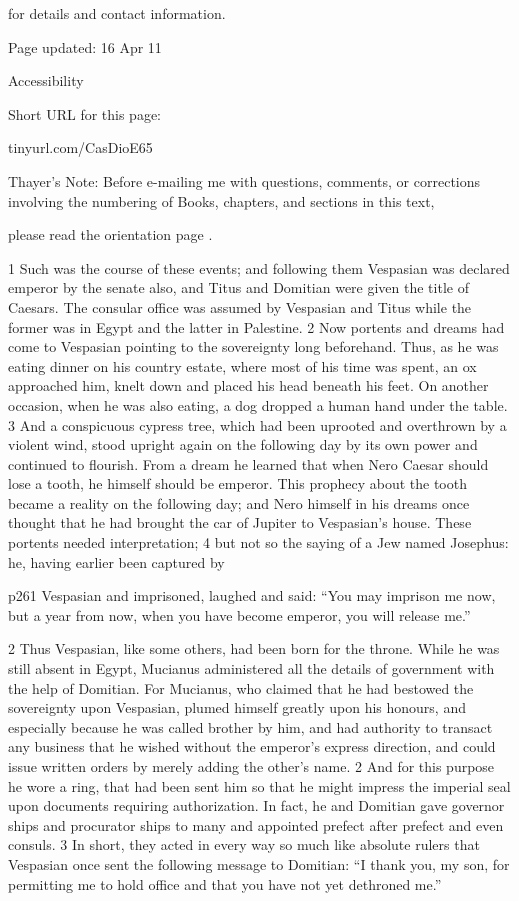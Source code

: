 for details and contact information.

Page updated:
16 Apr 11

Accessibility


Short URL for this page:

tinyurl.com/CasDioE65

Thayer's Note: Before e-mailing me with questions, comments, or corrections involving the numbering of Books, chapters, and sections in this text,

please read the orientation page .


1
Such was the course of these events; and following them Vespasian was declared emperor by the senate also, and Titus and Domitian were given the title of Caesars. The consular office was assumed by Vespasian and Titus while the former was in Egypt and the latter in Palestine. 2 Now portents and dreams had come to Vespasian pointing to the sovereignty long beforehand. Thus, as he was eating dinner on his country estate, where most of his time was spent, an ox approached him, knelt down and placed his head beneath his feet. On another occasion, when he was also eating, a dog dropped a human hand under the table. 3 And a conspicuous cypress tree, which had been uprooted and overthrown by a violent wind, stood upright again on the following day by its own power and continued to flourish. From a dream he learned that when Nero Caesar should lose a tooth, he himself should be emperor. This prophecy about the tooth became a reality on the following day; and Nero himself in his dreams once thought that he had brought the car of Jupiter to Vespasian's house. These portents needed interpretation; 4 but not so the saying of a Jew named Josephus: he, having earlier been captured by

p261 Vespasian and imprisoned, laughed and said: ``You may imprison me now, but a year from now, when you have become emperor, you will release me.''

2
Thus Vespasian, like some others, had been born for the throne. While he was still absent in Egypt, Mucianus administered all the details of government with the help of Domitian. For Mucianus, who claimed that he had bestowed the sovereignty upon Vespasian, plumed himself greatly upon his honours, and especially because he was called brother by him, and had authority to transact any business that he wished without the emperor's express direction, and could issue written orders by merely adding the other's name. 2 And for this purpose he wore a ring, that had been sent him so that he might impress the imperial seal upon documents requiring authorization. In fact, he and Domitian gave governor ­ships and procurator ­ships to many and appointed prefect after prefect and even consuls. 3 In short, they acted in every way so much like absolute rulers that Vespasian once sent the following message to Domitian: ``I thank you, my son, for permitting me to hold office and that you have not yet dethroned me.''

